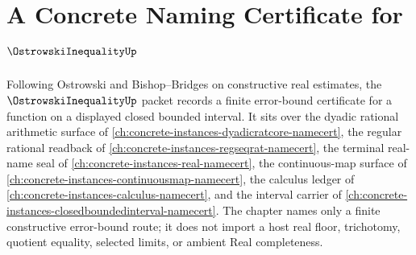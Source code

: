 \chapter{A Concrete Naming Certificate for $\OstrowskiInequalityUp$}
\label{ch:concrete-instances-ostrowski-inequality-namecert}

Following Ostrowski and Bishop--Bridges on constructive real estimates, the $\OstrowskiInequalityUp$ packet records a finite error-bound certificate for a function on a displayed closed bounded interval. It sits over the dyadic rational arithmetic surface of \autoref{ch:concrete-instances-dyadicratcore-namecert}, the regular rational readback of \autoref{ch:concrete-instances-regseqrat-namecert}, the terminal real-name seal of \autoref{ch:concrete-instances-real-namecert}, the continuous-map surface of \autoref{ch:concrete-instances-continuousmap-namecert}, the calculus ledger of \autoref{ch:concrete-instances-calculus-namecert}, and the interval carrier of \autoref{ch:concrete-instances-closedboundedinterval-namecert}. The chapter names only a finite constructive error-bound route; it does not import a host real floor, trichotomy, quotient equality, selected limits, or ambient Real completeness.

